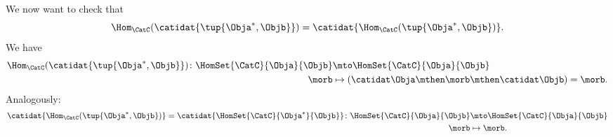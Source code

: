 We now want to check that
\begin{equation}
    \label{eq:hom_identity}
    \Hom_\CatC(\catidat{\tup{\Obja^*,\Objb}})=\catidat{\Hom_\CatC(\tup{\Obja^*,\Objb})}.
\end{equation}
%
We have
%
\begin{equation}
    \begin{aligned}
        \Hom_\CatC(\catidat{\tup{\Obja^*,\Objb}})\colon \HomSet{\CatC}{\Obja}{\Objb} & \mto \HomSet{\CatC}{\Obja}{\Objb} \\
        \morb                                                                        & \mapsto (\catidat\Obja \mthen \morb \mthen \catidat\Objb)=\morb.
    \end{aligned}
\end{equation}
%
Analogously:
%
\begin{equation}
    \begin{aligned}
        \catidat{\Hom_\CatC(\tup{\Obja^*,\Objb})}=\catidat{\HomSet{\CatC}{\Obja^*}{\Objb}} \colon \HomSet{\CatC}{\Obja}{\Objb} & \mto \HomSet{\CatC}{\Obja}{\Objb} \\
        \morb                                                                                                                  & \mapsto \morb.
    \end{aligned}
\end{equation}

\devel{}

